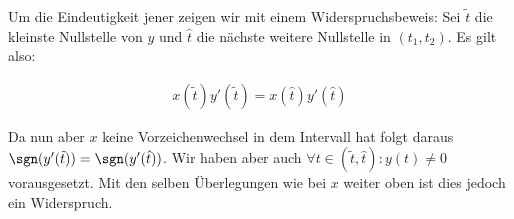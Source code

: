 \begin{solution}
\begin{itemize}
  Um die Eindeutigkeit jener zeigen wir mit einem Widerspruchsbeweis: Sei $\tilde{t}$
  die kleinste Nullstelle von $y$ und $\hat{t}$ die nächste weitere Nullstelle in
  $(t_1 , t_2 )$. Es gilt also:

  \begin{align*}
    x( \tilde{t} ) y'( \tilde{t} ) = x( \hat{t} ) y'( \hat{t} )
  \end{align*}

  Da nun aber $x$ keine Vorzeichenwechsel in dem Intervall hat folgt daraus
  $\sgn(y^{\prime}(\tilde{t})) = \sgn(y^{\prime}(\hat{t}))$. Wir haben aber auch
  $\forall t \in (\tilde{t},\hat{t}): y(t) \neq 0 $ vorausgesetzt. Mit den selben Überlegungen
  wie bei $x$ weiter oben ist dies jedoch ein Widerspruch.
\end{itemize}
\end{solution}
